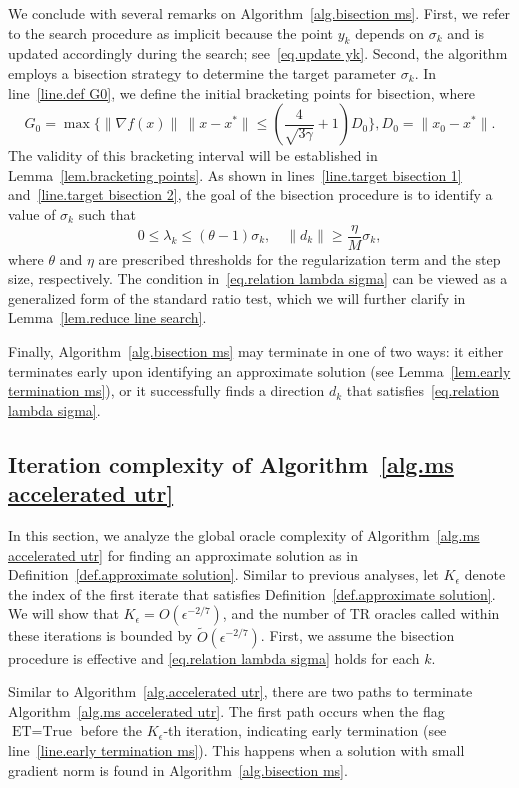 \documentclass{mcom-l}
\numberwithin{equation}{section}
\begin{document}
We conclude with several remarks on Algorithm~\ref{alg.bisection ms}. First, we refer to the search procedure as implicit because the point $y_k$ depends on $\sigma_k$ and is updated accordingly during the search; see~\eqref{eq.update yk}. Second, the algorithm employs a bisection strategy to determine the target parameter $\sigma_k$. In line~\ref{line.def G0}, we define the initial bracketing points for bisection, where
$$G_0 = \max\{\|\nabla f(x)\| \ \|x-x^*\|\leq \left(\frac{4}{\sqrt{3\gamma}}+1\right)D_0\}, D_0 = \|x_0-x^*\|.$$
The validity of this bracketing interval will be established in Lemma~\ref{lem.bracketing points}. As shown in lines~\ref{line.target bisection 1} and~\ref{line.target bisection 2}, the goal of the bisection procedure is to identify a value of $\sigma_k$ such that
\begin{equation}
    \label{eq.relation lambda sigma}
    0 \leq \lambda_k \leq (\theta - 1)\sigma_k, \quad \|d_k\| \geq \frac{\eta}{M} \sigma_k,
\end{equation}
where $\theta$ and $\eta$ are prescribed thresholds for the regularization term and the step size, respectively. The condition in~\eqref{eq.relation lambda sigma} can be viewed as a generalized form of the standard ratio test, which we will further clarify in Lemma~\ref{lem.reduce line search}.

Finally, Algorithm~\ref{alg.bisection ms} may terminate in one of two ways: it either terminates early upon identifying an approximate solution (see Lemma~\ref{lem.early termination ms}), or it successfully finds a direction $d_k$ that satisfies~\eqref{eq.relation lambda sigma}.

\subsection{Iteration complexity of Algorithm~\ref{alg.ms accelerated utr}}
In this section, we analyze the global oracle complexity of Algorithm~\ref{alg.ms accelerated utr} for finding an approximate solution as in Definition~\ref{def.approximate solution}. Similar to previous analyses, let $K_\epsilon$ denote the index of the first iterate that satisfies Definition~\ref{def.approximate solution}. We will show that $K_\epsilon = O(\epsilon^{-2/7})$, and the number of TR oracles called within these iterations is bounded by $\tilde{O}(\epsilon^{-2/7})$. First, we assume the bisection procedure is effective and \eqref{eq.relation lambda sigma} holds for each $k$.

Similar to Algorithm~\ref{alg.accelerated utr}, there are two paths to terminate Algorithm~\ref{alg.ms accelerated utr}. The first path occurs when the flag $\textrm{ET} = \text{True}$ before the $K_\epsilon$-th iteration, indicating early termination (see line~\ref{line.early termination ms}). This happens when a solution with small gradient norm is found in Algorithm~\ref{alg.bisection ms}.
\end{document}
